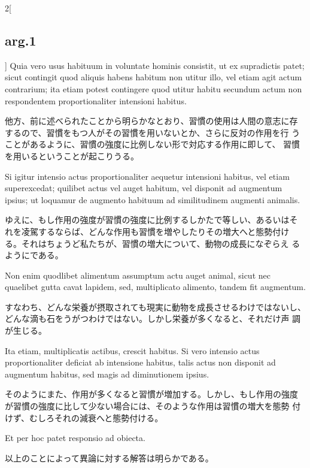\documentclass[paper=a4paper,fontsize=10pt,jafontsize=9pt,titlepage]{jlreq}
\begin{document}
\begin{paracol}{2}[\subsection{arg.1}]
Quia vero usus habituum in voluntate hominis
consistit, ut ex supradictis patet; sicut contingit quod aliquis
habens habitum non utitur illo, vel etiam agit actum contrarium; ita
etiam potest contingere quod utitur habitu secundum actum non
respondentem proportionaliter intensioni habitus.

\switchcolumn

他方、前に述べられたことから明らかなとおり、習慣の使用は人間の意志に存
 するので、習慣をもつ人がその習慣を用いないとか、さらに反対の作用を行
 うことがあるように、習慣の強度に比例しない形で対応する作用に即して、
 習慣を用いるということが起こりうる。

\switchcolumn*

Si igitur intensio
actus proportionaliter aequetur intensioni habitus, vel etiam
superexcedat; quilibet actus vel auget habitum, vel disponit ad
augmentum ipsius; ut loquamur de augmento habituum ad similitudinem
augmenti animalis.

\switchcolumn

ゆえに、もし作用の強度が習慣の強度に比例するしかたで等しい、あるいはそ
 れを凌駕するならば、どんな作用も習慣を増やしたりその増大へと態勢付け
 る。それはちょうど私たちが、習慣の増大について、動物の成長になぞらえ
 るようにである。

\switchcolumn*

Non enim quodlibet alimentum assumptum actu auget
animal, sicut nec quaelibet gutta cavat lapidem, sed, multiplicato
alimento, tandem fit augmentum.

\switchcolumn

すなわち、どんな栄養が摂取されても現実に動物を成長させるわけではないし、
 どんな滴も石をうがつわけではない。しかし栄養が多くなると、それだけ声
 調が生じる。

\switchcolumn*

Ita etiam, multiplicatis actibus,
crescit habitus. Si vero intensio actus proportionaliter deficiat ab
intensione habitus, talis actus non disponit ad augmentum habitus, sed
magis ad diminutionem ipsius.

\switchcolumn

そのようにまた、作用が多くなると習慣が増加する。しかし、もし作用の強度
が習慣の強度に比して少ない場合には、そのような作用は習慣の増大を態勢
付けず、むしろそれの減衰へと態勢付ける。

\switchcolumn*

Et per hoc patet responsio ad obiecta.

\switchcolumn

以上のことによって異論に対する解答は明らかである。

\end{paracol}
\end{document}
